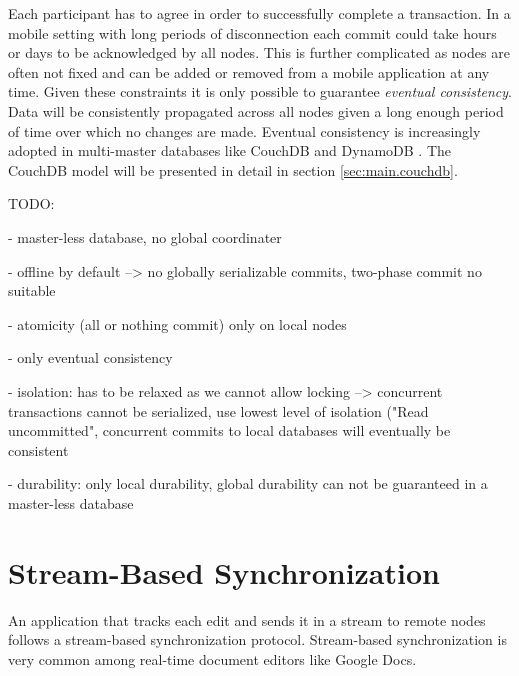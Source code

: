 Each participant has to agree in order to successfully complete a transaction.
In a mobile setting with long periods of disconnection each commit could take hours or days to be acknowledged by all nodes.
This is further complicated as nodes are often not fixed and can be added or removed from a mobile application at any time.
Given these constraints it is only possible to guarantee \emph{eventual consistency}.
Data will be consistently propagated across all nodes given a long enough period of time over which no changes are made.
Eventual consistency is increasingly adopted in multi-master databases like CouchDB \cite{anderson2010couchdb} and DynamoDB \cite{DeCandia:2007ui}.
The CouchDB model will be presented in detail in section \ref{sec:main.couchdb}.


TODO:

- master-less database, no global coordinater

- offline by default --> no globally serializable commits, two-phase commit no suitable

- atomicity (all or nothing commit) only on local nodes

- only eventual consistency

- isolation: has to be relaxed as we cannot allow locking --> concurrent transactions cannot be serialized, use lowest level of isolation ("Read uncommitted", concurrent commits to local databases will eventually be consistent

- durability: only local durability, global durability can not be guaranteed in a master-less database

\section{Stream-Based Synchronization}
\label{sec:background.stream-based}
An application that tracks each edit and sends it in a stream to remote nodes follows a stream-based synchronization protocol.
Stream-based synchronization is very common among real-time document editors like Google Docs.\\

